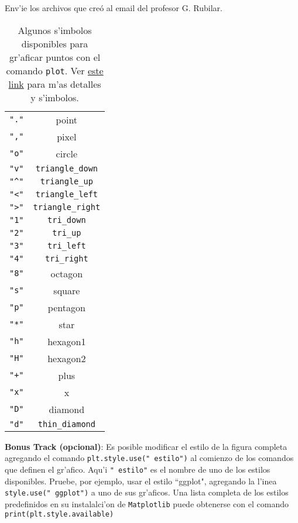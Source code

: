 \documentclass[11pt]{exam}
\begin{document}
\begin{questions}
\item Env'ie los archivos que creó al email del profesor G. Rubilar.
\begin{table}
\begin{center}
\begin{tabular}{cc}
\verb|"."|	& point \\
\verb|","| & pixel \\
\verb|"o"|	& circle \\
\verb|"v"|	& \verb|triangle_down| \\
\verb|"^"|	& \verb|triangle_up| \\
\verb|"<"|	& \verb|triangle_left| \\
\verb|">"|	& \verb|triangle_right| \\
\verb|"1"|	& \verb|tri_down| \\
\verb|"2"|	& \verb|tri_up| \\
\verb|"3"|	& \verb|tri_left| \\
\verb|"4"|	& \verb|tri_right| \\
\verb|"8"|	& octagon \\
\verb|"s"|	& square \\
\verb|"p"|	& pentagon \\
\verb|"*"|	& star \\
\verb|"h"|	& hexagon1 \\
\verb|"H"|	& hexagon2 \\
\verb|"+"|	& plus \\
\verb|"x"|	& x \\
\verb|"D"|	& diamond \\
\verb|"d"|	& \verb|thin_diamond| 
\end{tabular}
\caption{Algunos s'imbolos disponibles para gr'aficar puntos con el comando \texttt{plot}. Ver \href{http://matplotlib.org/api/markers_api.html}{este link} para m'as detalles y s'imbolos.}
\label{t}
\end{center}
\end{table}
\item \textbf{Bonus Track (opcional)}: Es posible modificar el estilo de la figura completa agregando el comando \texttt{plt.style.use("\,\!estilo")} al comienzo de los comandos que definen el gr'afico. Aqu'i \texttt{"\,\!estilo"} es el nombre de uno de los estilos disponibles. Pruebe, por ejemplo, usar el estilo ``ggplot", agregando la l'inea \texttt{style.use("\,\!ggplot")} a uno de sus gr'aficos. Una lista completa de los estilos predefinidos en su instalalci'on de \texttt{Matplotlib} puede obtenerse con el comando \texttt{print(plt.style.available)}

\end{questions}
\end{document}
